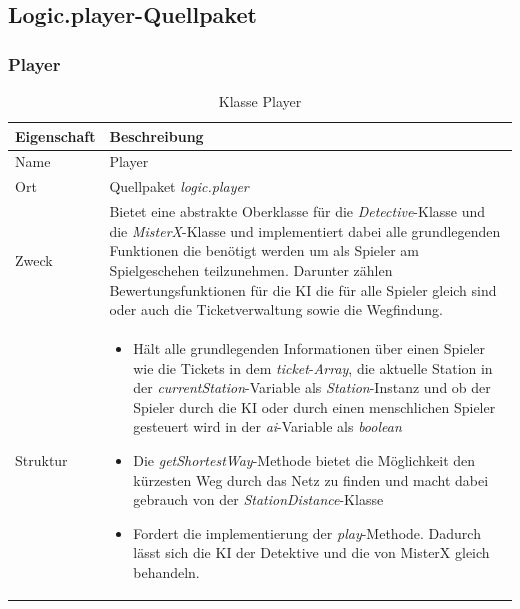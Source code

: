 \subsection{Logic.player-Quellpaket}
    \subsubsection{Player}
        \begin{table}[H]
            \caption{Klasse Player}
            \begin{tabular}{p{2.5cm}  p{9.5cm}} 
                \hline
                \textbf{Eigenschaft} & \textbf{Beschreibung}\\
                \hline
                Name & Player\\
                Ort & Quellpaket \textit{logic.player}\\
                \hline
                Zweck &
                Bietet eine abstrakte Oberklasse für die \textit{Detective}-Klasse und die \textit{MisterX}-Klasse
                und implementiert dabei alle grundlegenden Funktionen die benötigt werden um als
                Spieler am Spielgeschehen teilzunehmen. Darunter zählen Bewertungsfunktionen für die KI die für alle Spieler gleich sind
                oder auch die Ticketverwaltung sowie die Wegfindung.
                \\
                \hline
                Struktur &
                \begin{itemize}
                    \itemsep0em
                    \item Hält alle grundlegenden Informationen über einen Spieler wie die Tickets in dem \textit{ticket}-\textit{Array},
                        die aktuelle Station in der \textit{currentStation}-Variable als \textit{Station}-Instanz und ob der Spieler durch die KI oder 
                        durch einen menschlichen Spieler gesteuert wird in der \textit{ai}-Variable als \textit{boolean}
                    \item Die \textit{getShortestWay}-Methode bietet die Möglichkeit den kürzesten Weg durch das Netz zu finden und macht dabei
                            gebrauch von der \textit{StationDistance}-Klasse
                    \item Fordert die implementierung der \textit{play}-Methode.
                    Dadurch lässt sich die KI der Detektive und die von MisterX gleich behandeln.
                \end{itemize}
                \\
                \hline
            \end{tabular}
        \end{table}
